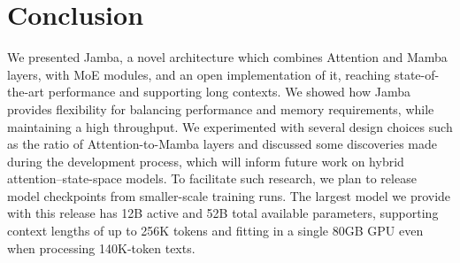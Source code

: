 \documentclass{article}
\def\jamba{Jamba\xspace}
\begin{document}
\vspace{-10pt}
\section{Conclusion}

We presented \jamba, a novel architecture which combines Attention and Mamba layers, with MoE modules, and an open implementation of it, reaching state-of-the-art performance and supporting long contexts.
We showed how \jamba provides flexibility for balancing performance and memory requirements, while maintaining a high throughput. We experimented with several design choices such as the ratio of Attention-to-Mamba layers  and discussed some discoveries made during the development process, which will inform future work on hybrid attention--state-space models. To facilitate such research, we plan to release model checkpoints from smaller-scale training runs. The largest model we provide with this release has 12B active and 52B total available parameters, supporting context lengths of up to 256K tokens and fitting in a single 80GB GPU even when processing 140K-token texts. 







\end{document}
